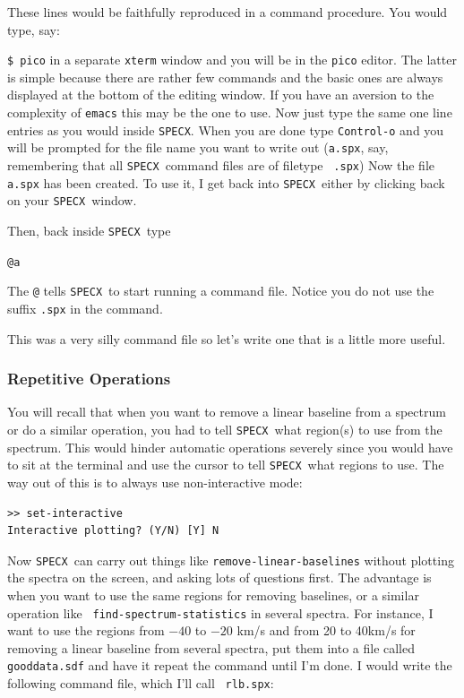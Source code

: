 \documentclass[11pt,twoside]{article}
\newcommand{\SPECX}{{\tt SPECX}}
\begin{document}
These lines would be faithfully reproduced in a command procedure. 
You would type, say:

\verb|$ pico|
in a separate {\tt xterm} window and you will be in the {\tt pico}
editor. The latter is simple because there are rather few commands and
the basic ones are always displayed at the bottom of the editing
window. If you have an aversion to the complexity of {\tt emacs} this
may be the one to use. Now just type the same one line entries as you
would inside \SPECX . When you are done type {\tt Control-o} and you
will be prompted for the file name you want to write out ({\tt{a.spx}},
say, remembering that all \SPECX\ command files are of filetype {\tt
.spx}) Now the file {\tt a.spx} has been created.  To use it, I get
back into \SPECX\ either by clicking back on your \SPECX\ window.

Then, back inside \SPECX\ type

\verb|@a|

The {\tt @} tells \SPECX\ to start running a command file.  Notice you
do not use the suffix {\tt .spx} in the command.

This was a very silly command file so let's write one that is a little
more useful.


\subsubsection{Repetitive Operations}
\label{sec:specx_9.2}

You will recall that when you want to remove a linear baseline from a
spectrum or do a similar operation, you had to tell \SPECX\ what
region(s) to use from the spectrum.  This would hinder automatic
operations severely since you would have to sit at the terminal and
use the cursor to tell \SPECX\ what regions to use.  The way out of
this is to always use non-interactive mode:

\begin{verbatim}
>> set-interactive
Interactive plotting? (Y/N) [Y] N
\end{verbatim}

Now \SPECX\ can carry out things like {\tt remove-linear-baselines}
without plotting the spectra on the screen, and asking lots of
questions first.  The advantage is when you want to use the same
regions for removing baselines, or a similar operation like {\tt
find-spectrum-statistics} in several spectra.  For instance, I want to
use the regions from $-40$ to $-20$ km/s and from 20 to 40km/s for
removing a linear baseline from several spectra, put them into a file
called {\tt gooddata.sdf} and have it repeat the command until I'm
done.  I would write the following command file, which I'll call {\tt
rlb.spx}:
\end{document}
